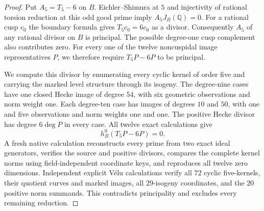\begin{proof}
Put $A_5=T_5-6$ on $B$. Eichler--Shimura at $5$ and injectivity of
rational torsion reduction at this odd good prime imply
$A_5J_B(\mathbb Q)=0$.
For a rational cusp $c_0$ the boundary formula gives
$T_5c_0=6c_0$ as a divisor. Consequently $A_5$ of any rational
divisor on $B$ is principal.
The possible degree-one cusp complement also contributes zero.
For every one of the twelve noncuspidal image representatives $P$,
we therefore require $T_5P-6P$ to be principal.

We compute this divisor by enumerating every cyclic kernel of order
five and carrying the marked level structure through its isogeny.
The degree-nine cases have one closed Hecke image of degree $54$,
with six geometric observations and norm weight one.
Each degree-ten case has images of degrees $10$ and $50$, with
one and five observations and norm weights one and one.
The positive Hecke divisor has degree $6\deg P$ in every case.
All twelve exact calculations give
\[
 h^0_B(T_5P-6P)=0.
\]
A fresh native calculation reconstructs every prime from two exact
ideal generators, verifies the source and positive divisors, compares
the complete kernel norms using field-independent coordinate keys,
and reproduces all twelve zero dimensions.
Independent explicit V\'elu calculations verify all $72$ cyclic
five-kernels, their quotient curves and marked images, all $29$-isogeny
coordinates, and the $20$ positive norm summands.
This contradicts principality and excludes every remaining reduction.
\end{proof}
